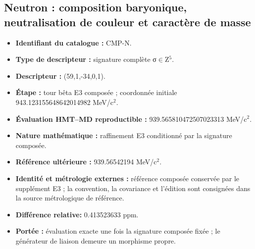 \subsection{Neutron : composition baryonique, neutralisation de couleur et caractère de masse}
\begin{itemize}
\item \textbf{Identifiant du catalogue :} CMP-N.
\item \textbf{Type de descripteur :} signature complète σ\(\in\)Z\({}^{5}\).
\item \textbf{Descripteur :} (59,1,-34,0,1).
\item \textbf{Étape :} tour bêta E3 composée ; coordonnée initiale 943.123155\allowbreak{}648642\allowbreak{}014982 MeV/c\({}^{2}\).
\item \textbf{Évaluation HMT--MD reproductible :} 939.565810\allowbreak{}472507\allowbreak{}023313 MeV/c\({}^{2}\).
\item \textbf{Nature mathématique :} raffinement E3 conditionné par la signature composée.
\item \textbf{Référence ultérieure :} 939.565421\allowbreak{}94 MeV/c\({}^{2}\).
\item \textbf{Identité et métrologie externes :} référence composée conservée par le supplément E3 ; la convention, la covariance et l’édition sont consignées dans la source métrologique de référence.
\item \textbf{Différence relative:} 0.413523\allowbreak{}633 ppm.
\item \textbf{Portée :} évaluation exacte une fois la signature composée fixée ; le générateur de liaison demeure un morphisme propre.
\end{itemize}
\endinput
\clearpage
